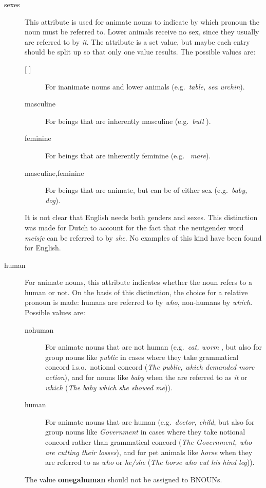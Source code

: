 \begin{description}
\item[sexes] This attribute is used for animate nouns to indicate
by which pronoun the noun must be referred to. Lower animals receive no sex,
since they usually are referred to by {\em it\/}. The attribute is a set value,
but maybe each entry should be split up so that only one value results.
The possible values are:
  \begin{description}
  \item[{[ ]}] For inanimate nouns and lower 
animals (e.g.\ {\em table, sea urchin\/}).
  \item[masculine] For beings that are inherently masculine (e.g.\ {\em bull
\/}).
  \item[feminine] For beings that are inherently feminine (e.g.\ {\em 
mare\/}).
  \item[masculine,feminine] For beings that are animate, but can be of 
either sex (e.g.\ {\em baby, dog\/}).
  \end{description}
It is not clear that English needs both genders and sexes. This distinction was 
made for Dutch to account for the fact that the neutgender word {\em meisje} 
can be referred to by {\em she}. No examples of this kind have been found for 
English.
\item[human] For animate nouns, this attribute indicates whether the noun 
refers to a human or not. On the basis of this distinction, the choice for a 
relative pronoun is made: humans are referred to by {\em who\/}, non-humans by 
{\em which\/}. Possible values are:
  \begin{description}
  \item[nohuman] For animate nouns that are not human (e.g.\ {\em cat, worm
\/}, but also for group nouns like {\em public\/} in cases where they take 
grammatical concord i.s.o.\ 
notional concord ({\em The public, which demanded more action\/}), and for 
nouns like {\em 
baby\/} when the are referred to as {\em it\/} or {\em which\/} ({\em The baby
 which she showed me\/})).
  \item[human] For animate nouns that are human (e.g.\ {\em doctor, child\/}, 
but also for group nouns like {\em Government\/} in cases where they take 
notional concord rather than grammatical concord ({\em The Government, who are 
cutting their losses\/}), and for pet animals like {\em horse\/} when they are 
referred to as {\em who\/} or {\em he/she\/} ({\em The horse who cut his hind
leg\/})).
  \end{description}
The value {\bf omegahuman} should not be assigned to BNOUNs.


\end{description}
